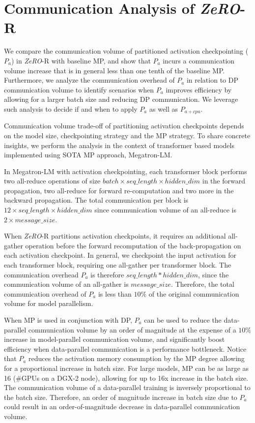 \documentclass{article}
\newcommand{\name}{\emph{ZeRO}\xspace}
\begin{document}
\section{Communication Analysis of \name-R}
We compare the communication volume of partitioned activation checkpointing ($P_a$) in \name-R with baseline MP, and show that $P_a$ incurs a communication volume increase that is in general less than one tenth of the baseline MP. Furthermore, we analyze the communication overhead of $P_a$ in relation to DP communication volume to identify scenarios when $P_a$ improves efficiency by allowing for a larger batch size and reducing DP communication.  We leverage such analysis to decide if and when to apply  $P_a$ as well as $P_{a+cpu}$.  

Communication volume trade-off of partitioning activation checkpoints depends on the model size, checkpointing strategy and the MP strategy.  To share concrete insights, we perform the analysis in the context of transformer based models implemented using SOTA MP approach, Megatron-LM.

In Megatron-LM with activation checkpointing, each transformer block performs two all-reduce operations of size $batch \times seq\_length \times hidden\_dim$ in the forward propagation, two all-reduce for forward re-computation and two more in the backward propagation.  The total communication per block is $12 \times seq\_length \times hidden\_dim$ since communication volume of an all-reduce is $2 \times message\_size$. 

When \name-R partitions activation checkpoints, it requires an additional all-gather operation before the forward recomputation of the back-propagation on each activation checkpoint. In general, we checkpoint the input activation for each transformer block, requiring one all-gather per transformer block. The communication overhead $P_a$ is therefore $seq\_length * hidden\_dim$, since the communication volume of an all-gather is $message\_size$. Therefore, the total communication overhead of $P_a$ is less than $10\%$ of the original communication volume for model parallelism.

When MP is used in conjunction with DP, $P_a$ can be used to reduce the data-parallel communication volume by an order of magnitude at the expense of a $10\%$ increase in model-parallel communication volume, and significantly boost efficiency when data-parallel communication is a performance bottleneck. Notice that $P_a$ reduces the activation memory consumption by the MP degree allowing for a proportional increase in batch size. For large models, MP can be as large as 16 (\#GPUs on a DGX-2 node), allowing for up to 16x increase in the batch size. The communication volume of a data-parallel training is inversely proportional to the batch size. Therefore, an order of magnitude increase in batch size due to $P_a$ could result in an order-of-magnitude decrease in data-parallel communication volume. 
\end{document}
